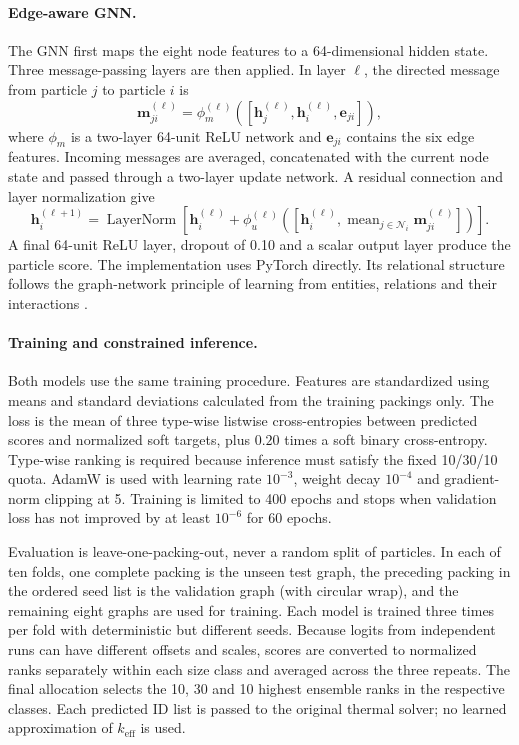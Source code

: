 \documentclass[12pt,a4paper]{article}
\begin{document}
	\paragraph{Edge-aware GNN.}
	The GNN first maps the eight node features to a 64-dimensional hidden state.
	Three message-passing layers are then applied. In layer $\ell$, the directed
	message from particle $j$ to particle $i$ is
	\begin{equation}
		\mathbf m_{ji}^{(\ell)}=
		\phi_m^{(\ell)}\!\left(
		[\mathbf h_j^{(\ell)},\mathbf h_i^{(\ell)},\mathbf e_{ji}]\right),
	\end{equation}
	where $\phi_m$ is a two-layer 64-unit ReLU network and $\mathbf e_{ji}$ contains
	the six edge features. Incoming messages are averaged, concatenated with the
	current node state and passed through a two-layer update network. A residual
	connection and layer normalization give
	\begin{equation}
		\mathbf h_i^{(\ell+1)}=\operatorname{LayerNorm}\!\left[
		\mathbf h_i^{(\ell)}+
		\phi_u^{(\ell)}\!\left(
		[\mathbf h_i^{(\ell)},\operatorname{mean}_{j\in\mathcal N_i}
		\mathbf m_{ji}^{(\ell)}]\right)\right].
	\end{equation}
	A final 64-unit ReLU layer, dropout of 0.10 and a scalar output layer produce the
	particle score. The implementation uses PyTorch directly. Its relational
	structure follows the graph-network principle of learning from entities,
	relations and their interactions \cite{Battaglia2018}.

	\paragraph{Training and constrained inference.}
	Both models use the same training procedure. Features are standardized using
	means and standard deviations calculated from the training packings only. The
	loss is the mean of three type-wise listwise cross-entropies between predicted
	scores and normalized soft targets, plus $0.20$ times a soft binary
	cross-entropy. Type-wise ranking is required because inference must satisfy the
	fixed 10/30/10 quota. AdamW is used with learning rate $10^{-3}$, weight decay
	$10^{-4}$ and gradient-norm clipping at 5. Training is limited to 400 epochs and
	stops when validation loss has not improved by at least $10^{-6}$ for 60 epochs.

	Evaluation is leave-one-packing-out, never a random split of particles. In each
	of ten folds, one complete packing is the unseen test graph, the preceding
	packing in the ordered seed list is the validation graph (with circular wrap),
	and the remaining eight graphs are used for training. Each model is trained
	three times per fold with deterministic but different seeds. Because logits from
	independent runs can have different offsets and scales, scores are converted to
	normalized ranks separately within each size class and averaged across the three
	repeats. The final allocation selects the 10, 30 and 10 highest ensemble ranks in
	the respective classes. Each predicted ID list is passed to the original thermal
	solver; no learned approximation of $k_{\mathrm{eff}}$ is used.
\end{document}
